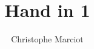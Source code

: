 \documentclass[11pt, a4paper, twoside]{article}
\begin{document}
\title{Hand in 1}
\author{Christophe Marciot}
\maketitle


	
\end{document}
